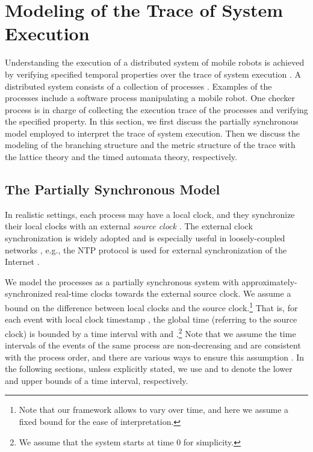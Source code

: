 \documentclass[10pt,conference,compsocconf,letterpaper]{IEEEtran}
\begin{document}
\section{Modeling of the Trace of System Execution} \label{sec:Modeling}

Understanding the execution of a distributed system of mobile robots is achieved by verifying specified temporal properties over the trace of system execution \cite{Cooper91}. A distributed system consists of a collection of processes . Examples of the processes include a software process manipulating a mobile robot. One checker process  is in charge of collecting the execution trace of the processes and verifying the specified property. In this section, we first discuss the partially synchronous model employed to interpret the trace of system execution. Then we discuss the modeling of the branching structure and the metric structure of the trace with the lattice theory and the timed automata theory, respectively.

\subsection{The Partially Synchronous Model} \label{sec:system model}

In realistic settings, each process  may have a local clock, and they synchronize their local clocks with an external \textit{source clock} . The external clock synchronization is widely adopted and is especially useful in loosely-coupled networks \cite{Patt94}, e.g., the NTP protocol is used for external synchronization of the Internet \cite{Mills91}.

We model the processes as a partially synchronous system with approximately-synchronized real-time clocks towards the external source clock. We assume a bound  on the difference between local clocks and the source clock.\footnote{Note that our framework allows  to vary over time, and here we assume a fixed bound  for the ease of interpretation.} That is, for each event  with local clock timestamp , the global time (referring to the source clock) is bounded by a time interval  with  and .\footnote{We assume that the system starts at time 0 for simplicity.} Note that we assume the time intervals of the events of the same process are non-decreasing and are consistent with the process order, and there are various ways to ensure this assumption \cite{Stoller00}. In the following sections, unless explicitly stated, we use  and  to denote the lower and upper bounds of a time interval, respectively.
\end{document}
